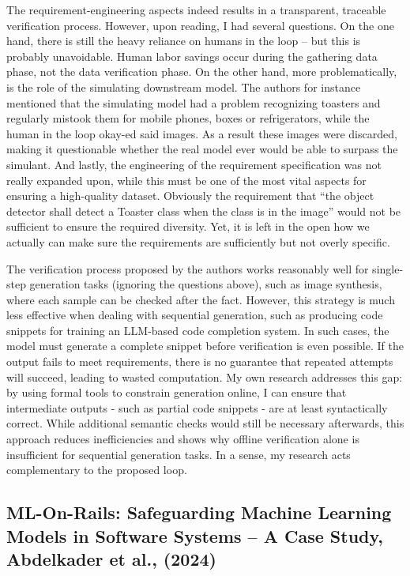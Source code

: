 \documentclass[a4paper, 11pt]{article}
\begin{document}
The requirement-engineering aspects indeed results in a transparent, traceable verification process. However, upon reading, I had several questions. On the one hand, there is still the heavy reliance on humans in the loop – but this is probably unavoidable. Human labor savings occur during the gathering data phase, not the data verification phase. On the other hand, more problematically, is the role of the simulating downstream model. The authors for instance mentioned that the simulating model had a problem recognizing toasters and regularly mistook them for mobile phones, boxes or refrigerators, while the human in the loop okay-ed said images. As a result these images were discarded, making it questionable whether the real model ever would be able to surpass the simulant. And lastly, the engineering of the requirement specification was not really expanded upon, while this must be one of the most vital aspects for ensuring a high-quality dataset. Obviously the requirement that “the object detector shall detect a Toaster class when the class is in the image” would not be sufficient to ensure the required diversity. Yet, it is left in the open how we actually can make sure the requirements are sufficiently but not overly specific.

The verification process proposed by the authors works reasonably well for single-step generation tasks (ignoring the questions above), such as image synthesis, where each sample can be checked after the fact. However, this strategy is much less effective when dealing with sequential generation, such as producing code snippets for training an LLM-based code completion system. In such cases, the model must generate a complete snippet before verification is even possible. If the output fails to meet requirements, there is no guarantee that repeated attempts will succeed, leading to wasted computation. My own research addresses this gap: by using formal tools to constrain generation online, I can ensure that intermediate outputs - such as partial code snippets - are at least syntactically correct. While additional semantic checks would still be necessary afterwards, this approach reduces inefficiencies and shows why offline verification alone is insufficient for sequential generation tasks. In a sense, my research acts complementary to the proposed loop.
\subsection{ML-On-Rails: Safeguarding Machine Learning Models in Software Systems – A Case Study, Abdelkader et al., (2024)}
\end{document}
